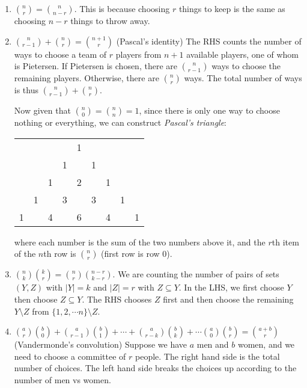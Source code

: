 \documentclass[a4paper]{article}
\begin{document}
\begin{prop}\leavevmode
  \begin{enumerate}
    \item $\displaystyle\binom{n}{r} = \binom{n}{n - r}$. This is because choosing $r$ things to keep is the same as choosing $n - r$ things to throw away.
    \item $\displaystyle\binom{n }{r - 1} + \binom{n}{r} = \binom{n + 1}{r}$ (Pascal's identity) The RHS counts the number of ways to choose a team of $r$ players from $n + 1$ available players, one of whom is Pietersen. If Pietersen is chosen, there are $\binom{n}{r - 1}$ ways to choose the remaining players. Otherwise, there are $\binom{n}{r}$ ways. The total number of ways is thus $\binom{n}{r - 1} + \binom{n}{r}$.

      Now given that $\binom{n}{0} =\binom{n}{n}= 1$, since there is only one way to choose nothing or everything, we can construct \emph{Pascal's triangle}:
      \begin{center}
        \begin{tabular}{lllllllll}
          &   &   &   & 1 &   &   &   &   \\
          &   &   & 1 &   & 1 &   &   &   \\
          &   & 1 &   & 2 &   & 1 &   &   \\
          & 1 &   & 3 &   & 3 &   & 1 &   \\
          1 &   & 4 &   & 6 &   & 4 &   & 1 \\
        \end{tabular}
      \end{center}
      where each number is the sum of the two numbers above it, and the $r$th item of the $n$th row is $\binom{n}{r}$ (first row is row $0$).
    \item $\displaystyle\binom{n }{k}\binom{k }{r} = \binom{n}{r}\binom{n - r}{k - r}$. We are counting the number of pairs of sets $(Y, Z)$ with $|Y| = k$ and $|Z| = r$ with $Z\subseteq Y$. In the LHS, we first choose $Y$ then choose $Z\subseteq Y$. The RHS chooses $Z$ first and then choose the remaining $Y\setminus Z$ from $\{1, 2, \cdots n\}\setminus Z$.
    \item $\displaystyle \binom{a}{r}\binom{b}{0} + \binom{a}{r - 1}\binom{b}{1} + \cdots + \binom{a }{r - k}\binom{b}{k} + \cdots \binom{a}{0}\binom{b}{r} = \binom{a + b}{r}$ (Vandermonde's convolution) Suppose we have $a$ men and $b$ women, and we need to choose a committee of $r$ people. The right hand side is the total number of choices. The left hand side breaks the choices up according to the number of men vs women.
  \end{enumerate}
\end{prop}
\end{document}
